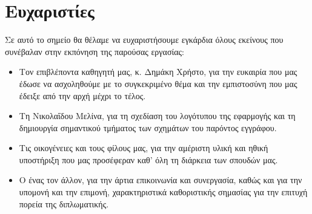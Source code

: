 \chapter*{Ευχαριστίες}

Σε αυτό το σημείο θα θέλαμε να ευχαριστήσουμε εγκάρδια όλους εκείνους που συνέβαλαν στην εκπόνηση της παρούσας εργασίας:

\begin{itemize}
	\item Τον επιβλέποντα καθηγητή μας, κ. Δημάκη Χρήστο, για την ευκαιρία που μας έδωσε να ασχοληθούμε με το συγκεκριμένο θέμα και την εμπιστοσύνη που μας έδειξε από την αρχή μέχρι το τέλος.
	\item Τη Νικολαΐδου Μελίνα, για τη σχεδίαση του λογότυπου της εφαρμογής και τη δημιουργία σημαντικού τμήματος των σχημάτων του παρόντος εγγράφου.
	\item Τις οικογένειες και τους φίλους μας, για την αμέριστη υλική και ηθική υποστήριξη που μας προσέφεραν καθ' όλη τη διάρκεια των σπουδών μας.
	\item Ο ένας τον άλλον, για την άρτια επικοινωνία και συνεργασία, καθώς και για την υπομονή και την επιμονή, χαρακτηριστικά καθοριστικής σημασίας για την επιτυχή πορεία της διπλωματικής.
\end{itemize}
